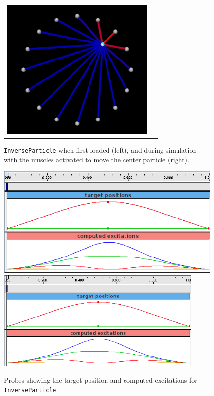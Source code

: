 \begin{figure}[ht]
\begin{center}
\begin{tabular}{cc}
      \includegraphics[width=3in]{images/InverseParticleB}
   \fi
\end{tabular}
\end{center}
\caption{{\tt InverseParticle} when first loaded (left), and
during simulation with the muscles activated to move
the center particle (right).}
\label{InverseParticle:fig}
\end{figure}

\begin{figure}[ht]
\begin{center}
\iflatexml
   \includegraphics[]{images/InverseParticleProbes}
\else
   \includegraphics[width=4in]{images/InverseParticleProbes}
\fi
\end{center}
\caption{Probes showing the target position and computed
excitations for {\tt InverseParticle}.}
\label{InverseParticleProbes:fig}
\end{figure}

